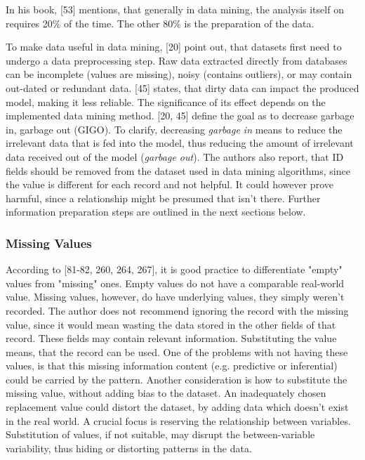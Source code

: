 In his book, \textcite{mccue2014data}[53] mentions, that generally in data mining, the analysis itself on requires 20\% of the time. The other 80\% is the preparation of the data.

To make data useful in data mining, \textcite{DataMiningAndPredictiveAnalytics}[20] point out, that datasets first need to undergo a data preprocessing step. Raw data extracted directly from databases can be incomplete (values are missing), noisy (contains outliers), or may contain out-dated or redundant data. \textcite{dataPreprocessingInDataMining}[45] states, that dirty data can impact the produced model, making it less reliable. The significance of its effect depends on the implemented data mining method. \textcite{DataMiningAndPredictiveAnalytics}[20, 45] define the goal as to decrease garbage in, garbage out (GIGO). To clarify, decreasing \textit{garbage in} means to reduce the irrelevant data that is fed into the model, thus reducing the amount of irrelevant data received out of the model (\textit{garbage out}). The authors also report, that ID fields should be removed from the dataset used in data mining algorithms, since the value is different for each record and not helpful. It could however prove harmful, since a relationship might be presumed that isn't there. Further information preparation steps are outlined in the next sections below.




\subsubsection{Missing Values}
\label{section:MissingValues}

According to \textcite{dataPreparationForDataMining}[81-82, 260, 264, 267], it is good practice to differentiate "empty" values from "missing" ones. Empty values do not have a comparable real-world value. Missing values, however, do have underlying values, they simply weren't recorded. The author does not recommend ignoring the record with the missing value, since it would mean wasting the data stored in the other fields of that record. These fields may contain relevant information. Substituting the value means, that the record can be used. One of the problems with not having these values, is that this missing information content (e.g. predictive or inferential) could be carried by the pattern. Another consideration is how to substitute the missing value, without adding bias to the dataset. An inadequately chosen replacement value could distort the dataset, by adding data which doesn't exist in the real world. A crucial focus is reserving the relationship between variables. Substitution of values, if not suitable, may disrupt the between-variable variability, thus hiding or distorting patterns in the data. 

